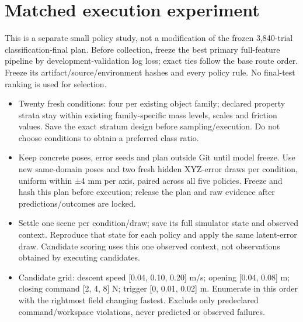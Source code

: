 \documentclass[11pt,letterpaper]{article}
\begin{document}
\section*{Matched execution experiment}

This is a separate small policy study, not a modification of the frozen 3,840-trial classification-final plan. Before collection, freeze the best primary full-feature pipeline by development-validation log loss; exact ties follow the base route order. Freeze its artifact/source/environment hashes and every policy rule. No final-test ranking is used for selection.

\begin{itemize}\item Twenty fresh conditions: four per existing object family; declared property strata stay within existing family-specific mass levels, scales and friction values. Save the exact stratum design before sampling/execution. Do not choose conditions to obtain a preferred class ratio.\end{itemize}

\begin{itemize}\item Keep concrete poses, error seeds and plan outside Git until model freeze. Use new same-domain poses and two fresh hidden XYZ-error draws per condition, uniform within ±4 mm per axis, paired across all five policies. Freeze and hash this plan before execution; release the plan and raw evidence after predictions/outcomes are locked.\end{itemize}

\begin{itemize}\item Settle one scene per condition/draw; save its full simulator state and observed context. Reproduce that state for each policy and apply the same latent-error draw. Candidate scoring uses this one observed context, not observations obtained by executing candidates.\end{itemize}

\begin{itemize}\item Candidate grid: descent speed [0.04, 0.10, 0.20] m/s; opening [0.04, 0.08] m; closing command [2, 4, 8] N; trigger [0, 0.01, 0.02] m. Enumerate in this order with the rightmost field changing fastest. Exclude only predeclared command/workspace violations, never predicted or observed failures.\end{itemize}
\end{document}

